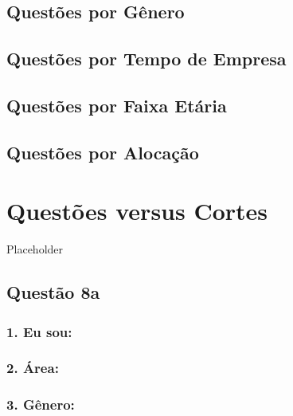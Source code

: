 \documentclass[]{book}
\begin{document}
\hypertarget{questoes-por-genero}{%
\section{Questões por Gênero}\label{questoes-por-genero}}

\hypertarget{questoes-por-tempo-de-empresa}{%
\section{Questões por Tempo de Empresa}\label{questoes-por-tempo-de-empresa}}

\hypertarget{questoes-por-faixa-etaria}{%
\section{Questões por Faixa Etária}\label{questoes-por-faixa-etaria}}

\hypertarget{questoes-por-alocacao}{%
\section{Questões por Alocação}\label{questoes-por-alocacao}}

\hypertarget{questoes-versus-cortes}{%
\chapter{Questões versus Cortes}\label{questoes-versus-cortes}}

Placeholder

\hypertarget{questao-8a}{%
\section{Questão 8a}\label{questao-8a}}

\hypertarget{eu-sou}{%
\subsection{1. Eu sou:}\label{eu-sou}}

\hypertarget{area}{%
\subsection{2. Área:}\label{area}}

\hypertarget{genero}{%
\subsection{3. Gênero:}\label{genero}}
\end{document}
